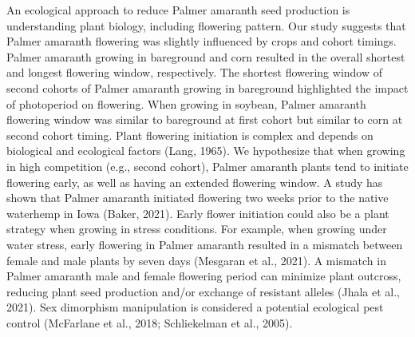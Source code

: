 \documentclass[utf8]{frontiersSCNS}
\begin{document}
An ecological approach to reduce Palmer amaranth seed production is
understanding plant biology, including flowering pattern. Our study
suggests that Palmer amaranth flowering was slightly influenced by crops
and cohort timings. Palmer amaranth growing in bareground and corn
resulted in the overall shortest and longest flowering window,
respectively. The shortest flowering window of second cohorts of Palmer
amaranth growing in bareground highlighted the impact of photoperiod on
flowering. When growing in soybean, Palmer amaranth flowering window was
similar to bareground at first cohort but similar to corn at second
cohort timing. Plant flowering initiation is complex and depends on
biological and ecological factors (Lang, 1965). We hypothesize that when
growing in high competition (e.g., second cohort), Palmer amaranth
plants tend to initiate flowering early, as well as having an extended
flowering window. A study has shown that Palmer amaranth initiated
flowering two weeks prior to the native waterhemp in Iowa (Baker, 2021).
Early flower initiation could also be a plant strategy when growing in
stress conditions. For example, when growing under water stress, early
flowering in Palmer amaranth resulted in a mismatch between female and
male plants by seven days (Mesgaran et al., 2021). A mismatch in Palmer
amaranth male and female flowering period can minimize plant outcross,
reducing plant seed production and/or exchange of resistant alleles
(Jhala et al., 2021). Sex dimorphism manipulation is considered a
potential ecological pest control (McFarlane et al., 2018; Schliekelman
et al., 2005).
\end{document}
